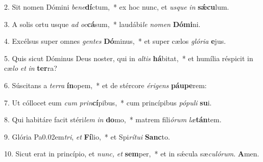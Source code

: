 \item 2. Sit nomen Dómini \textit{be}\textit{ne}\textbf{dí}ctum,~* ex hoc nunc, et \textit{usque} \textit{in} \textbf{sǽcu}lum.
\item 3. A solis ortu usque \textit{ad} \textit{oc}\textbf{cá}sum,~* laudábi\textit{le} \textit{nomen} \textbf{Dómi}ni.
\item 4. Excélsus super omnes \textit{gentes} \textbf{Dó}minus,~* et super cælos \textit{glória} \textbf{e}jus.
\item 5. Quis sicut Dóminus Deus noster, qui in \textit{altis} \textbf{há}bitat,~* et humília réspicit in cæ\hspace{0.03em}\textit{lo} \textit{et} \textit{in} \textbf{ter}ra?
\item 6. Súscitans a \textit{terra} \textbf{ín}opem,~* et de stércore \textit{érigens} \textbf{páu}\textbf{pe}rem:
\item 7. Ut cóllocet eum \textit{cum} \textit{prin}\textbf{cí}pibus,~* cum princípibus \textit{pópuli} \textbf{su}i.
\item 8. Qui habitáre facit stéri\textit{lem} \textit{in} \textbf{do}mo,~* matrem fili\textit{órum} \textit{læ}\textbf{tán}tem.
\item 9. Glória Pa\kern0.02em\textit{tri}, \textit{et} \textbf{Fí}lio,~* et Spi\textit{rítui} \textbf{Sanc}to.
\item 10. Sicut erat in princípio, et \textit{nunc,} \textit{et} \textbf{sem}per,~* et in sǽcula sæ\hspace{0.03em}\textit{culórum}. \textbf{A}men.